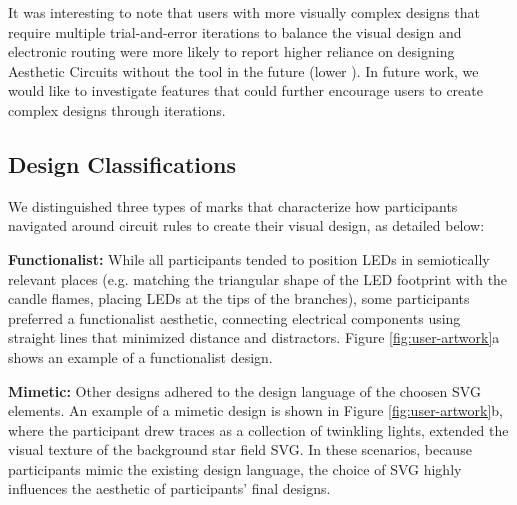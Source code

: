 \documentclass{sigchi}
\begin{document}
It was interesting to note that users with more visually complex designs that require multiple trial-and-error iterations to balance the visual design and electronic routing were more likely to report higher reliance on designing Aesthetic Circuits without the tool in the future (lower ). In future work, we would like to investigate features that could further encourage users to create complex designs through iterations.
  
 \subsection{Design Classifications}

 We distinguished three types of marks that characterize how participants navigated around circuit rules to create their visual design, as detailed below:
  


  \textbf{Functionalist:} While all participants tended to position LEDs in semiotically relevant places (e.g. matching the triangular shape of the LED footprint with the candle flames, placing LEDs at the tips of the branches), some participants preferred a functionalist aesthetic, connecting electrical components using straight lines that minimized distance and distractors. Figure \ref{fig:user-artwork}a shows an example of a functionalist design. 

  \textbf{Mimetic:}
  Other designs adhered to the design language of the choosen SVG elements. An example of a mimetic design is shown in Figure \ref{fig:user-artwork}b, where the participant drew traces as a collection of twinkling lights, extended the visual texture of the background star field SVG.  In these scenarios, because participants mimic the existing design language, the choice of SVG highly influences the aesthetic of participants' final designs.
  
\end{document}
